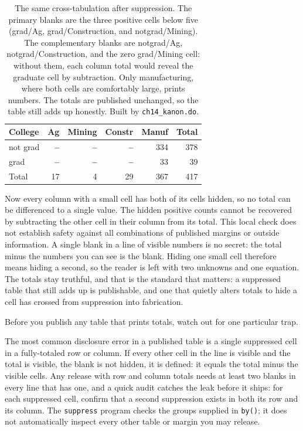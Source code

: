 \begin{table}[htbp]
\centering
{\footnotesize
\begin{tabular}{lrrrrr}
\hline
College   & Ag & Mining & Constr & Manuf & Total \\
\hline
not grad  & \textbf{--} & \textbf{--} & \textbf{--} & 334 & 378 \\
grad      & \textbf{--} & \textbf{--} & \textbf{--} &  33 &  39 \\
\hline
Total     & 17 &  4 & 29 & 367 & 417 \\
\hline
\end{tabular}
}
\caption[Primary and complementary suppression]{The same cross-tabulation after suppression. The primary blanks are the three positive cells below five (grad/Ag, grad/Construction, and notgrad/Mining). The complementary blanks are notgrad/Ag, notgrad/Construction, and the zero grad/Mining cell: without them, each column total would reveal the graduate cell by subtraction. Only manufacturing, where both cells are comfortably large, prints numbers. The totals are published unchanged, so the table still adds up honestly. Built by \texttt{ch14\_kanon.do}.}
\label{tab:suppress}
\end{table}

Now every column with a small cell has both of its cells hidden, so no total can be differenced to a single value. The hidden positive counts cannot be recovered by subtracting the other cell in their column from its total. This local check does not establish safety against all combinations of published margins or outside information. A single blank in a line of visible numbers is no secret: the total minus the numbers you can see is the blank. Hiding one small cell therefore means hiding a second, so the reader is left with two unknowns and one equation. The totals stay truthful, and that is the standard that matters: a suppressed table that still adds up is publishable, and one that quietly alters totals to hide a cell has crossed from suppression into fabrication.

Before you publish any table that prints totals, watch out for one particular trap.

\begin{vizcallout}
The most common disclosure error in a published table is a single suppressed cell in a fully-totaled row or column. If every other cell in the line is visible and the total is visible, the blank is not hidden, it is defined: it equals the total minus the visible cells. Any release with row and column totals needs at least two blanks in every line that has one, and a quick audit catches the leak before it ships: for each suppressed cell, confirm that a second suppression exists in both its row and its column. The \texttt{suppress} program checks the groups supplied in \texttt{by()}; it does not automatically inspect every other table or margin you may release.
\end{vizcallout}

